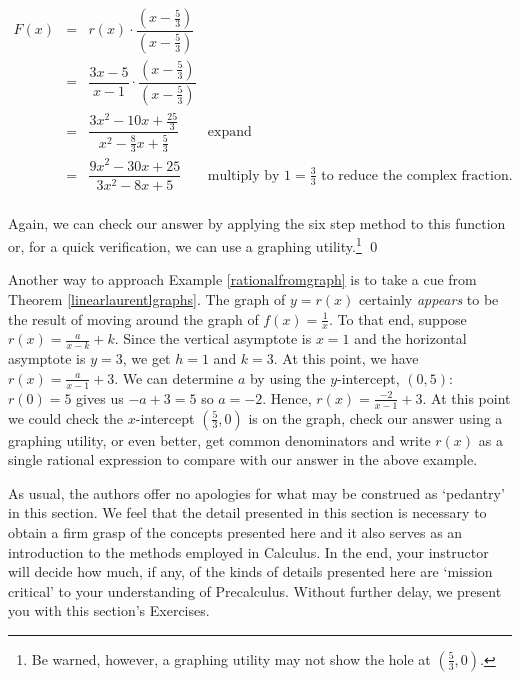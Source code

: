 \documentclass{ximera}
\begin{document}
\begin{example}
\[ \begin{array}{rclr}

F(x) & = &  r(x) \cdot \dfrac{\left(x - \frac{5}{3} \right)}{\left(x - \frac{5}{3} \right)} & \\
       & = &  \dfrac{3x-5}{x-1} \cdot \dfrac{\left(x - \frac{5}{3} \right)}{\left(x - \frac{5}{3} \right)} & \\
       & = & \dfrac{3x^2-10x+\frac{25}{3}}{x^2 - \frac{8}{3} x + \frac{5}{3}} & \text{expand}\\
       & = & \dfrac{9x^2-30x+25}{3x^2-8x+5} & \text{multiply by $1 = \frac{3}{3}$ to reduce the complex fraction.}\\ \end{array} \]

Again, we can check our answer by applying the six step method to this function or, for a quick verification, we can use a graphing utility.\footnote{Be warned, however, a graphing utility may not show the hole at  $\left(\frac{5}{3}, 0 \right)$.} \qed
 

\end{example}

Another way to approach Example \ref{rationalfromgraph} is to take a cue from Theorem \ref{linearlaurentlgraphs}.  The graph of $y=r(x)$ certainly \textit{appears} to be the result of moving around the graph of $f(x) = \frac{1}{x}$.  To that end, suppose $r(x) = \frac{a}{x-k} + k$.  Since the vertical asymptote is $x=1$ and the horizontal asymptote is $y=3$, we get $h=1$ and $k=3$.  At this point, we have $r(x) = \frac{a}{x-1}+3$.  We can determine $a$ by using the $y$-intercept, $(0,5)$:  $r(0) =5$ gives us $-a+3 = 5$ so $a = -2$.  Hence, $r(x) = \frac{-2}{x-1}+3$.  At this point we could check the $x$-intercept  $\left(\frac{5}{3}, 0 \right)$ is on the graph, check our answer using a graphing utility, or even better, get common denominators and write $r(x)$ as a single rational expression to compare with our answer in the above example.  

As usual, the authors offer no apologies for what may be construed as `pedantry' in this section.  We feel that the detail presented in this section is necessary to obtain a firm grasp of the concepts presented here and it also serves as an introduction to the methods employed in Calculus. In the end,  your instructor will decide how much, if any, of the kinds of details presented here are `mission critical' to your understanding of Precalculus. Without further delay, we present you with this section's Exercises.
\end{document}
